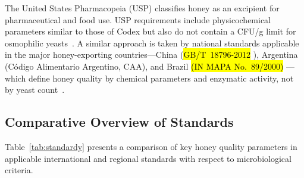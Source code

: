 \documentclass[foods,review,accept,pdftex,moreauthors]{Definitions/mdpi}
\begin{document}
The United States Pharmacopeia (USP) classifies honey as an excipient
for pharmaceutical and food use. USP requirements include
physicochemical parameters similar to those of Codex but also do not
contain a CFU/g limit for osmophilic yeasts~\cite{tsagkaris2021}.
A similar approach is taken by national standards applicable in the
major honey-exporting countries---China (\hl{GB/T~18796-2012}%
), Argentina
(Código Alimentario Argentino, CAA), and Brazil \hl{(IN MAPA No.~89/2000)}%
---which define honey quality by chemical parameters and enzymatic
activity, not by yeast count~\cite{tsagkaris2021}.

\subsection{Comparative Overview of Standards}

Table~\ref{tab:standardy} presents a comparison of key honey quality
parameters in applicable international and regional standards with
respect to microbiological criteria.
\end{document}
